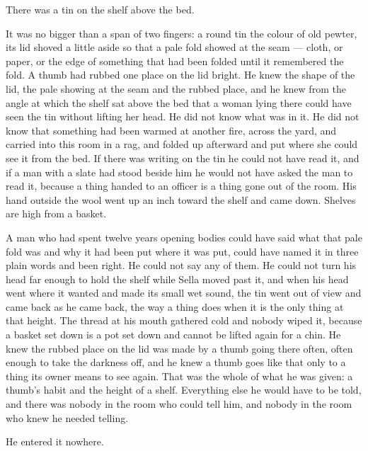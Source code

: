 There was a tin on the shelf above the bed.

It was no bigger than a span of two fingers: a round tin the colour of old pewter, its lid shoved a little aside so that a pale fold showed at the seam --- cloth, or paper, or the edge of something that had been folded until it remembered the fold. A thumb had rubbed one place on the lid bright. He knew the shape of the lid, the pale showing at the seam and the rubbed place, and he knew from the angle at which the shelf sat above the bed that a woman lying there could have seen the tin without lifting her head. He did not know what was in it. He did not know that something had been warmed at another fire, across the yard, and carried into this room in a rag, and folded up afterward and put where she could see it from the bed. If there was writing on the tin he could not have read it, and if a man with a slate had stood beside him he would not have asked the man to read it, because a thing handed to an officer is a thing gone out of the room. His hand outside the wool went up an inch toward the shelf and came down. Shelves are high from a basket.

A man who had spent twelve years opening bodies could have said what that pale fold was and why it had been put where it was put, could have named it in three plain words and been right. He could not say any of them. He could not turn his head far enough to hold the shelf while Sella moved past it, and when his head went where it wanted and made its small wet sound, the tin went out of view and came back as he came back, the way a thing does when it is the only thing at that height. The thread at his mouth gathered cold and nobody wiped it, because a basket set down is a pot set down and cannot be lifted again for a chin. He knew the rubbed place on the lid was made by a thumb going there often, often enough to take the darkness off, and he knew a thumb goes like that only to a thing its owner means to see again. That was the whole of what he was given: a thumb's habit and the height of a shelf. Everything else he would have to be told, and there was nobody in the room who could tell him, and nobody in the room who knew he needed telling.

He entered it nowhere.

